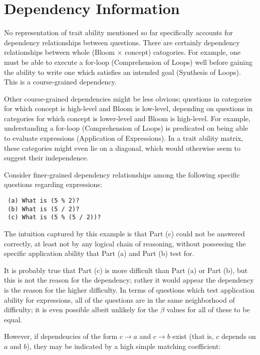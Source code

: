 \section{Dependency Information}

No representation of trait ability mentioned so far specifically accounts for
dependency relationships between questions.  There are certainly dependency
relationships between whole (Bloom $\times$ concept) catogories.  For example,
one must be able to execute a for-loop (Comprehension of Loops) well before
gaining the ability to write one which satisfies an intended goal (Synthesis of
Loops). This is a course-grained dependency.

Other course-grained dependencies might be less obvious; questions in
categories for which concept is high-level and Bloom is low-level, depending on
questions in categories for which concept is lower-level and Bloom is
high-level.  For example, understanding a for-loop (Comprehension of Loops) is
predicated on being able to evaluate expressions (Application of Expressions).
In a trait ability matrix, these categories might even lie on a diagonal, which
would otherwise seem to suggest their independence.

Consider finer-grained dependency relationships among the following specific
questions regarding expressions:

\begin{verbatim}
 (a) What is (5 % 2)?
 (b) What is (5 / 2)?
 (c) What is (5 % (5 / 2))?
\end{verbatim}

The intuition captured by this example is that Part (c) could not be answered
correctly, at least not by any logical chain of reasoning, without possessing
the specific application ability that Part (a) and Part (b) test for.

It is probably true that Part (c) is more difficult than Part (a) or Part (b),
but this is not the reason for the dependency; rather it would appear the
dependency is the reason for the higher difficulty.  In terms of questions
which test application ability for expressions, all of the questions are in the
same neighborhood of difficulty; it is even possible albeit unlikely for the
$\beta$ values for all of these to be equal.  

However, if dependencies of the form $c \rightarrow a$ and $c \rightarrow b$
exist (that is, $c$ depends on $a$ and $b$), they may be indicated by a
high simple matching coefficient:


